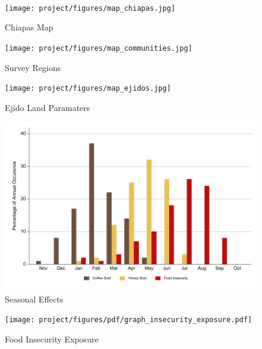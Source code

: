\documentclass[../main.tex]{subfiles}
\begin{document}








\\

\begin{figure}[h!]
    \centering
    \caption{Chiapas Map}
    \label{fig:map_chiapas_map}    \texttt{[image: project/figures/map\_chiapas.jpg]}
\end{figure}

\begin{figure}[h!]
    \centering
    \caption{Survey Regions}
    \label{fig:map_survey_regions}    \texttt{[image: project/figures/map\_communities.jpg]}
\end{figure}

\begin{figure}[h!]
    \centering
    \caption{Ejido Land Paramaters}
    \label{fig:map_ejidos}    \texttt{[image: project/figures/map\_ejidos.jpg]}
\end{figure}

\begin{figure}[h!]
    \centering
    \caption{Seasonal Effects}
    \label{fig:graph_seasonal_effects}   \includegraphics[width=1\textwidth]{project/figures/pdf/graph_seasonal_effects.pdf}
\end{figure}

\begin{figure}[h!]
    \centering
    \caption{Food Insecurity Exposure}
    \label{fig:graph_food_insecurity_exposure}    \texttt{[image: project/figures/pdf/graph\_insecurity\_exposure.pdf]}
\end{figure}
\end{document}
